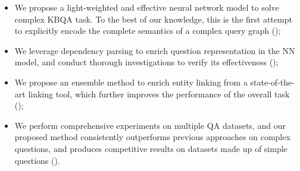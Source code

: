 \begin{itemize}
\item We propose a light-weighted and effective neural network model to solve complex KBQA task.
      To the best of our knowledge, this is the first attempt to
      explicitly encode the complete semantics of a complex 
 	  query graph ();
\item We leverage dependency parsing to enrich question representation 
	  in the NN model, and conduct thorough investigations to 
	  verify its effectiveness ();
\item We propose an ensemble method to enrich entity linking from
      a state-of-the-art linking tool, which further improves the 
      performance of the overall task ();

\item We perform comprehensive experiments on multiple QA datasets,
      and our proposed method consistently outperforms previous approaches 
	  on complex questions, and produces competitive results on 
	  datasets made up of simple questions ().
\end{itemize}


%
%  
%
